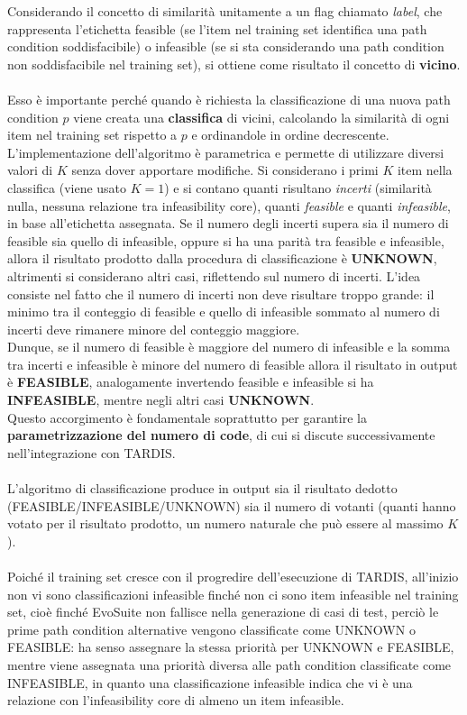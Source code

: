 \documentclass[a4paper, 12pt, oneside]{book}
\theoremstyle{normal}
\begin{document}
\clearpage \noindent Considerando il concetto di similarità unitamente a un flag chiamato \emph{label}, che rappresenta l'etichetta feasible (se l'item nel training set identifica una path condition soddisfacibile) o infeasible (se si sta considerando una path condition non soddisfacibile nel training set), si ottiene come risultato il concetto di \textbf{vicino}. \\ \\ Esso è importante perché quando è richiesta la classificazione di una nuova path condition $p$ viene creata una \textbf{classifica} di vicini, calcolando la similarità di ogni item nel training set rispetto a $p$ e ordinandole in ordine decrescente. \\ L'implementazione dell'algoritmo è parametrica e permette di utilizzare diversi valori di $K$ senza dover apportare modifiche. Si considerano i primi $K$ item nella classifica (viene usato $K = 1$) e si contano quanti risultano \emph{incerti} (similarità nulla, nessuna relazione tra infeasibility core), quanti \emph{feasible} e quanti \emph{infeasible}, in base all'etichetta assegnata. Se il numero degli incerti supera sia il numero di feasible sia quello di infeasible, oppure si ha una parità tra feasible e infeasible, allora il risultato prodotto dalla procedura di classificazione è \textbf{UNKNOWN}, altrimenti si considerano altri casi, riflettendo sul numero di incerti. L'idea consiste nel fatto che il numero di incerti non deve risultare troppo grande: il minimo tra il conteggio di feasible e quello di infeasible sommato al numero di incerti deve rimanere minore del conteggio maggiore. \\ Dunque, se il numero di feasible è maggiore del numero di infeasible e la somma tra incerti e infeasible è minore del numero di feasible allora il risultato in output è \textbf{FEASIBLE}, analogamente invertendo feasible e infeasible si ha \textbf{INFEASIBLE}, mentre negli altri casi \textbf{UNKNOWN}. \\ Questo accorgimento è fondamentale soprattutto per garantire la \textbf{parametrizzazione del numero di code}, di cui si discute successivamente nell'integrazione con TARDIS. \\ \\ L'algoritmo di classificazione produce in output sia il risultato dedotto (FEASIBLE/INFEASIBLE/UNKNOWN) sia il numero di votanti (quanti hanno votato per il risultato prodotto, un numero naturale che può essere al massimo $K$). \\ \\ Poiché il training set cresce con il progredire dell'esecuzione di TARDIS, all'inizio non vi sono classificazioni infeasible finché non ci sono item infeasible nel training set, cioè finché EvoSuite non fallisce nella generazione di casi di test, perciò le prime path condition alternative vengono classificate come UNKNOWN o FEASIBLE: ha senso assegnare la stessa priorità per UNKNOWN e FEASIBLE, mentre viene assegnata una priorità diversa alle path condition classificate come INFEASIBLE, in quanto una classificazione infeasible indica che vi è una relazione con l'infeasibility core di almeno un item infeasible.
\end{document}
